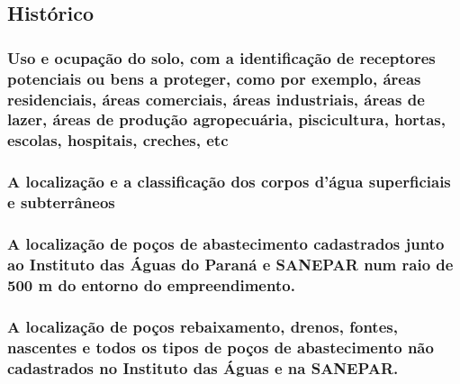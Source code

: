 \subsection{Histórico}

%
%
%

\subsubsection[Uso e ocupação do solo]{Uso e ocupação do solo, com a identificação de 
receptores potenciais ou bens a proteger, como por exemplo, 
áreas residenciais, áreas comerciais, áreas industriais, 
áreas de lazer, áreas de produção agropecuária, 
piscicultura, hortas, escolas, hospitais, creches, etc}

\subsubsection{A localização e a classificação dos corpos d’água 
superficiais e subterrâneos}

\subsubsection{A localização de poços de abastecimento cadastrados junto 
ao Instituto das Águas do Paraná e SANEPAR num raio de 500 
m do entorno do empreendimento.}

\subsubsection{A localização de poços rebaixamento, drenos, fontes, 
nascentes e todos os tipos de poços de abastecimento não 
cadastrados no Instituto das Águas e na SANEPAR.}

